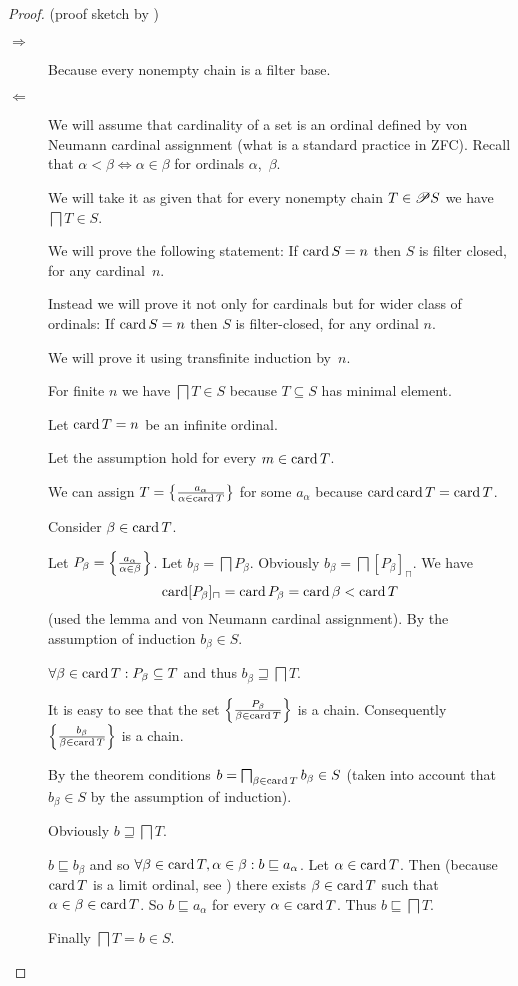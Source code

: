 \begin{proof}
(proof sketch by )
\begin{description}
\item [{$\Rightarrow$}] Because every nonempty chain is a filter base.
\item [{$\Leftarrow$}] We will assume that cardinality of a set is an
ordinal defined by von Neumann cardinal assignment (what is a standard
practice in ZFC). Recall that $\alpha<\beta\Leftrightarrow\alpha\in\beta$
for ordinals $\alpha$,~$\beta$.


We will take it as given that for every nonempty chain $T\in\mathscr{P} S$
we have $\bigsqcap T\in S$.


We will prove the following statement: If $\operatorname{card} S=n$ then $S$ is
filter closed, for any cardinal~$n$.


Instead we will prove it not only for cardinals but for wider class
of ordinals: If $\operatorname{card} S=n$ then $S$ is filter-closed, for any ordinal
$n$.


We will prove it using transfinite induction by~$n$.


For finite $n$ we have $\bigsqcap T\in S$ because $T\subseteq S$
has minimal element.


Let $\operatorname{card} T=n$ be an infinite ordinal.


Let the assumption hold for every $m\in\operatorname{card} T$.


We can assign $T=\left\{ \frac{a_{\alpha}}{\alpha\in\operatorname{card} T}\right\}$ for some
$a_{\alpha}$ because $\operatorname{card}\operatorname{card} T=\operatorname{card} T$.


Consider $\beta\in\operatorname{card} T$.


Let $P_{\beta}=\left\{ \frac{a_{\alpha}}{\alpha\in\beta}\right\}$. Let $b_{\beta}=\bigsqcap P_{\beta}$.
Obviously $b_{\beta}=\bigsqcap[P_{\beta}]_{\sqcap}$. We have
\[
\operatorname{card}[P_{\beta}]_{\sqcap}=\operatorname{card} P_{\beta}=\operatorname{card}\beta<\operatorname{card} T
\]
(used the lemma and von Neumann cardinal assignment). By the assumption
of induction $b_{\beta}\in S$.


$\forall\beta\in\operatorname{card} T:P_{\beta}\subseteq T$ and thus $b_{\beta}\sqsupseteq\bigsqcap T$.


It is easy to see that the set $\left\{ \frac{P_{\beta}}{\beta\in\operatorname{card} T}\right\}$
is a chain. Consequently $\left\{ \frac{b_{\beta}}{\beta\in\operatorname{card} T}\right\}$ is
a chain.


By the theorem conditions $b=\bigsqcap_{\beta\in\operatorname{card} T}b_{\beta}\in S$
(taken into account that $b_{\beta}\in S$ by the assumption of induction).


Obviously $b\sqsupseteq\bigsqcap T$.


$b\sqsubseteq b_{\beta}$ and so $\forall\beta\in\operatorname{card} T,\alpha\in\beta:b\sqsubseteq a_{\alpha}$.
Let $\alpha\in\operatorname{card} T$. Then (because $\operatorname{card} T$ is a limit ordinal,
see \cite{wiki:limit-ordinal}) there exists $\beta\in\operatorname{card} T$ such
that $\alpha\in\beta\in\operatorname{card} T$. So $b\sqsubseteq a_{\alpha}$ for
every $\alpha\in\operatorname{card} T$. Thus $b\sqsubseteq\bigsqcap T$.


Finally $\bigsqcap T=b\in S$.

\end{description}
\end{proof}


